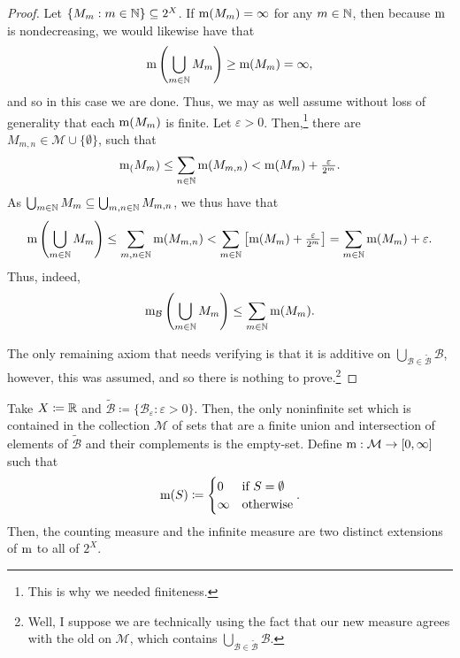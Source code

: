 \begin{thm}
\begin{savenotes}
\begin{proof}
Let $\{ M_m:m\in \mathbb{N} \} \subseteq 2^X$.  If $\mathrm{m} (M_m)=\infty$ for any $m\in \mathbb{N}$, then because $\mathrm{m}$ is nondecreasing, we would likewise have that
\begin{equation}
\mathrm{m} \left( \bigcup _{m\in \mathbb{N}}M_m\right) \geq \mathrm{m} (M_m)=\infty ,
\end{equation}
and so in this case we are done.  Thus, we may as well assume without loss of generality that each $\mathrm{m} (M_m)$ is finite.  Let $\varepsilon >0$.  Then,\footnote{This is why we needed finiteness.} there are $M_{m,n}\in \mathcal{M}\cup \{ \emptyset \}$, such that
\begin{equation}
\mathrm{m} _(M_m)\leq \sum _{n\in \mathbb{N}}\mathrm{m} (M_{m,n})<\mathrm{m} (M_m)+\tfrac{\varepsilon}{2^m}.
\end{equation}
As $\bigcup _{m\in \mathbb{N}}M_m\subseteq \bigcup _{m,n\in \mathbb{N}}M_{m,n}$, we thus have that
\begin{equation}
\mathrm{m} \left( \bigcup _{m\in \mathbb{N}}M_m\right) \leq \sum _{m,n\in \mathbb{N}}\mathrm{m} (M_{m,n})<\sum _{m\in \mathbb{N}}\left[ \mathrm{m} (M_m)+\tfrac{\varepsilon}{2^m}\right] =\sum _{m\in \mathbb{N}}\mathrm{m} (M_m)+\varepsilon .
\end{equation}
Thus, indeed,
\begin{equation}
\mathrm{m} _{\mathcal{B}}\left( \bigcup _{m\in \mathbb{N}}M_m\right) \leq \sum _{m\in \mathbb{N}}\mathrm{m} (M_m).
\end{equation}

The only remaining axiom that needs verifying is that it is additive on $\bigcup _{\mathcal{B}\in \widetilde{\mathcal{B}}}\mathcal{B}$, however, this was assumed, and so there is nothing to prove.\footnote{Well, I suppose we are technically using the fact that our new measure agrees with the old on $\mathcal{M}$, which contains $\bigcup _{\mathcal{B}\in \widetilde{\mathcal{B}}}\mathcal{B}$.}
\end{proof}
\end{savenotes}
\end{thm}
\begin{exm}\label{exm5.1.22}
Take $X\coloneqq \mathbb{R}$ and $\widetilde{\mathcal{B}}\coloneqq \{ \mathcal{B}_\varepsilon :\varepsilon >0\}$.  Then, the only noninfinite set which is contained in the collection $\mathcal{M}$ of sets that are a finite union and intersection of elements of $\widetilde{\mathcal{B}}$ and their complements is the empty-set.  Define $\mathrm{m} :\mathcal{M}\rightarrow [0,\infty ]$ such that
\begin{equation}
\mathrm{m} (S)\coloneqq \begin{cases}0 & \text{if }S=\emptyset \\ \infty & \text{otherwise}\end{cases}.
\end{equation}
Then, the counting measure and the infinite measure are two distinct extensions of $\mathrm{m}$ to all of $2^X$.
\end{exm}


